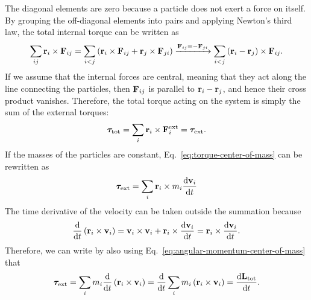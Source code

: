 \documentclass[12pt]{article}
\begin{document}
The diagonal elements are zero because a particle does not exert a force on itself. By grouping the off-diagonal elements into pairs and applying Newton's third law, the total internal torque can be written as
\[
\sum_{ij}\vb{r}_i \times \vb{F}_{ij} = \sum_{i<j}\left(\vb{r}_i \times \vb{F}_{ij} + \vb{r}_j \times \vb{F}_{ji} \right) \xrightarrow{{\mathbf{F}_{ij} = -\mathbf{F}_{ji}}} \sum_{i<j}\left(\vb{r}_i - \vb{r}_j\right) \times \vb{F}_{ij}.
\]
If we assume that the internal forces are central, meaning that they act along the line connecting the particles, then $\vb{F}_{ij}$ is parallel to $\vb{r}_i - \vb{r}_j$, and hence their cross product vanishes. Therefore, the total torque acting on the system is simply the sum of the external torques:
\begin{equation}
    \bm{\tau}_{\text{tot}} = \sum_i \vb{r}_i \times \vb{F}_i^{\mathrm{ext}} = \bm{\tau}_{\mathrm{ext}}.
    \label{eq:torque-center-of-mass}
\end{equation}
If the masses of the particles are constant, Eq.~\eqref{eq:torque-center-of-mass} can be rewritten as
\[
    \bm{\tau}_{\mathrm{ext}}= \sum_i \vb{r}_i \times m_i  \dv{ \vb{v}_i}{t}
\]
The time derivative of the velocity can be taken outside the summation because
\[
    \dv{t}\left(\vb{r}_i \times \vb{v}_i\right) = \vb{v}_i \times \vb{v}_i + \vb{r}_i \times \dv{\vb{v}_i}{t} = \vb{r}_i \times \dv{\vb{v}_i}{t}.
\]
Therefore, we can write by also using Eq.~\eqref{eq:angular-momentum-center-of-mass} that
\[
    \bm{\tau}_{\mathrm{ext}} = \sum_i m_i \dv{t}\left(\vb{r}_i \times \vb{v}_i\right) = \dv{t}\sum_i m_i\left(\vb{r}_i \times \vb{v}_i\right) = \dv{\vb{L}_{\text{tot}}}{t}.
\]
\end{document}
